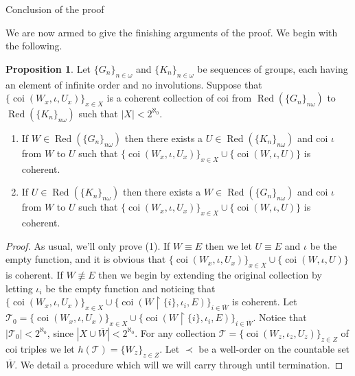 \documentclass{amsart}
\theoremstyle{definition}\newtheorem{theorem}{Theorem}
\theoremstyle{definition}\newtheorem*{A}{Main Theorem}
\theoremstyle{definition}\newtheorem*{B}{Theorem \ref{elementaryequiv}}
\theoremstyle{definition}\newtheorem*{C}{Theorem \ref{continuous}}
\theoremstyle{definition}\newtheorem*{D}{Theorem \ref{bigisomorphism2}}
\theoremstyle{definition}\newtheorem{bigtheorem}{Main Theorem}
\numberwithin{theorem}{section}
\theoremstyle{definition}\newtheorem{corollary}[theorem]{Corollary}
\theoremstyle{definition}\newtheorem{proposition}[theorem]{Proposition}
\theoremstyle{definition}\newtheorem{definition}[theorem]{Definition}
\theoremstyle{definition}\newtheorem{question}[theorem]{Question}
\theoremstyle{definition}\newtheorem{example}[theorem]{Example}
\theoremstyle{definition}\newtheorem{remark}[theorem]{Remark}
\theoremstyle{definition}\newtheorem{note}[theorem]{Note}
\theoremstyle{definition}\newtheorem{lemma}[theorem]{Lemma}
\theoremstyle{definition}\newtheorem{fact}[theorem]{Fact}
\theoremstyle{definition}\newtheorem{define}[theorem]{Definition}
\theoremstyle{definition}\newtheorem{claim}[theorem]{Claim}
\theoremstyle{definition}\newtheorem{obs}[theorem]{Observation}
\theoremstyle{definition}\newtheorem{definitions}[theorem]{Definitions}
\newcommand{\Red}{\operatorname{Red}}
\newcommand{\coi}{\operatorname{coi}}
\begin{document}
\begin{section}{Conclusion of the proof}\label{Finally}


We are now armed to give the finishing arguments of the proof.  We begin with the following.

\begin{proposition}\label{generalextension}  Let $\{G_n\}_{n \in \omega}$ and $\{K_n\}_{n \in \omega}$ be sequences of groups, each having an element of infinite order and no involutions.  Suppose that $\{\coi(W_x, \iota, U_x)\}_{x \in X}$ is a coherent collection of coi from $\Red(\{G_n\}_{n \omega})$ to $\Red(\{K_n\}_{n \omega})$ such that $|X| < 2^{\aleph_0}$.

\begin{enumerate}

\item If $W \in \Red(\{G_n\}_{n \omega})$ then there exists a $U \in \Red(\{K_n\}_{n \omega})$ and coi $\iota$ from $W$ to $U$ such that $\{\coi(W_x, \iota, U_x)\}_{x \in X} \cup \{\coi(W, \iota, U)\}$ is coherent.

\item If $U \in \Red(\{K_n\}_{n \omega})$ then there exists a $W \in \Red(\{G_n\}_{n \omega})$ and coi $\iota$ from $W$ to $U$ such that $\{\coi(W_x, \iota, U_x)\}_{x \in X} \cup \{\coi(W, \iota, U)\}$ is coherent.

\end{enumerate}


\end{proposition}

\begin{proof}  As usual, we'll only prove (1).  If $W \equiv E$ then we let $U \equiv E$ and $\iota$ be the empty function, and it is obvious that $\{\coi(W_x, \iota, U_x)\}_{x \in X} \cup \{\coi(W, \iota, U)\}$ is coherent.  If $W \not\equiv E$ then we begin by extending the original collection by letting $\iota_i$ be the empty function and noticing that $\{\coi(W_x, \iota, U_x)\}_{x \in X} \cup \{\coi(W\upharpoonright \{i\}, \iota_i, E)\}_{i \in \overline{W}}$ is coherent.  Let $\mathcal{T}_0 = \{\coi(W_x, \iota, U_x)\}_{x \in X} \cup \{\coi(W\upharpoonright \{i\}, \iota_i, E)\}_{i \in \overline{W}}$.  Notice that $|\mathcal{T}_0| < 2^{\aleph_0}$, since $|X \cup \overline{W}| < 2^{\aleph_0}$.  For any collection $\mathcal{T} = \{\coi(W_z, \iota_z, U_z)\}_{z \in Z}$ of coi triples we let $h(\mathcal{T}) = \{W_z\}_{z \in Z}$.  Let $\prec$ be a well-order on the countable set $\overline{W}$.  We detail a procedure which will we will carry through until termination.


\end{proof}
\end{section}
\end{document}
